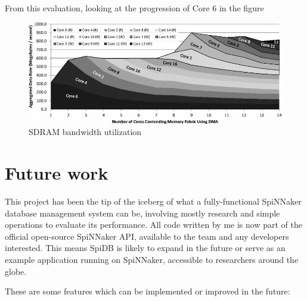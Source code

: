 From this evaluation, looking at the progression of Core 6 in the figure

\cite{painkras}


\begin{figure}
\begin{center}
	\includegraphics[width=1.3\textwidth, natwidth=820, natheight=329]{images/sdram_bandwidth.png}
\end{center}
\caption{SDRAM bandwidth utilization}
\label{fig:write-perf-benchmark}
\end{figure}




\section{Future work}
This project has been the tip of the iceberg of what a fully-functional SpiNNaker database management system can be, involving mostly research and simple operations to evaluate its performance. All code written by me is now part of the official open-source SpiNNaker API, available to the team and any developers interested. This means SpiDB is likely to expand in the future or serve as an example application running on SpiNNaker, accessible to researchers around the globe.

These are some features which can be implemented or improved in the future:

